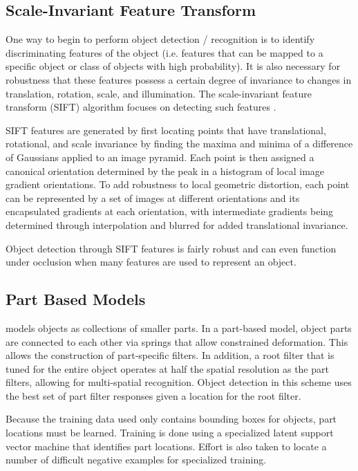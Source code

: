 \documentclass[10pt,twocolumn,letterpaper]{article}
\begin{document}
\subsection{Scale-Invariant Feature Transform}

One way to begin to perform object detection / recognition is to identify discriminating
features of the object (i.e. features that can be mapped to a specific object or class of
objects with high probability). It is also necessary for robustness that these features
possess a certain degree of invariance to changes in translation, rotation, scale, and
illumination. The scale-invariant feature transform (SIFT) algorithm focuses on detecting
such features \cite{LoweObjSIFT}.

SIFT features are generated by first locating points that have translational, rotational,
and scale invariance by finding the maxima and minima of a difference of Gaussians
applied to an image pyramid. Each point is then assigned a canonical orientation
determined by the peak in a histogram of local image gradient orientations. To add
robustness to local geometric distortion, each point can be represented by a set of
images at different orientations and its encapsulated gradients at each orientation,
with intermediate gradients being determined through interpolation and blurred for
added translational invariance.

Object detection through SIFT features is fairly robust and can even function under
occlusion when many features are used to represent an object.

\subsection{Part Based Models}

\cite{PartModels} models objects as collections of smaller parts.
In a part-based model, object parts are connected to each other via springs that
allow constrained deformation. This allows the construction of part-specific filters.
In addition, a root filter that is tuned for the entire object operates at half
the spatial resolution as the part filters, allowing for multi-spatial recognition.
Object detection in this scheme uses the best set of part filter responses given a
location for the root filter.

Because the training data used only contains bounding boxes for objects,
part locations must be learned. Training is done using a specialized latent support
vector machine that identifies part locations. Effort is also taken to locate a
number of difficult negative examples for specialized training.
\end{document}

